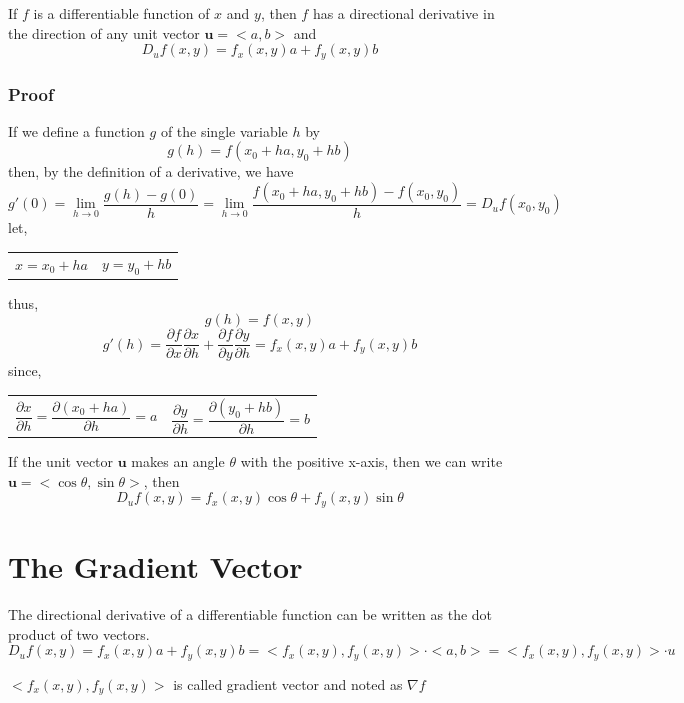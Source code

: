 \begin{theorem}
    If $f$ is a differentiable function of $x$ and $y$, then $f$ has a directional derivative in the direction of any unit vector $\textbf{u} = <a, b>$ and
    \begin{equation}
        D_uf(x, y) = f_x(x, y)a + f_y(x, y)b
    \end{equation}
\end{theorem}

\subsubsection{Proof}
If we define a function $g$ of the single variable $h$ by
$$
    g(h) = f(x_0 + ha, y_0 + hb)
$$
then, by the definition of a derivative, we have
$$
    g'(0) = \lim_{h \to 0}\frac{g(h) - g(0)}{h} = \lim_{h \to 0}\frac{f(x_0 + ha, y_0 + hb) - f(x_0, y_0)}{h} = D_uf(x_0, y_0)
$$
let,

\begin{tabularx}{\linewidth}{@{}XX@{}}
    $
        x = x_0 + ha
    $
    &
    $
        y = y_0 + hb
    $
\end{tabularx}

thus,
$$
    g(h) = f(x, y)
$$
$$
    g'(h) = \frac{\partial f}{\partial x}\frac{\partial x}{\partial h} + \frac{\partial f}{\partial y}\frac{\partial y}{\partial h} = f_x(x, y)a + f_y(x, y)b
$$
since,

\begin{tabularx}{\linewidth}{@{}XX@{}}
$$
    \frac{\partial x}{\partial h}=\frac{\partial (x_0 + ha)}{\partial h}=a
$$
&
$$
    \frac{\partial y}{\partial h}=\frac{\partial (y_0 + hb)}{\partial h}=b
$$
\end{tabularx}

\begin{theorem}
    If the unit vector $\textbf{u}$ makes an angle $\theta$ with the positive x-axis, then we can write $\textbf{u}=<\cos \theta, \sin \theta>$, then
    \begin{equation}
        \label{eq:Directional Derivative}
        D_uf(x, y)=f_x(x, y)\cos \theta + f_y(x, y) \sin \theta
    \end{equation}
\end{theorem}

\section{The Gradient Vector}
\begin{definition}
    The directional derivative of a differentiable function can be written as the dot product of two vectors.
    \begin{equation}
        D_uf(x, y)=f_x(x, y)a + f_y(x, y)b=<f_x(x, y), f_y(x, y)> \cdot <a, b> = <f_x(x, y), f_y(x, y)> \cdot u
    \end{equation}
\end{definition}
$<f_x(x, y), f_y(x, y)>$ is called gradient vector and noted as $\nabla f$

